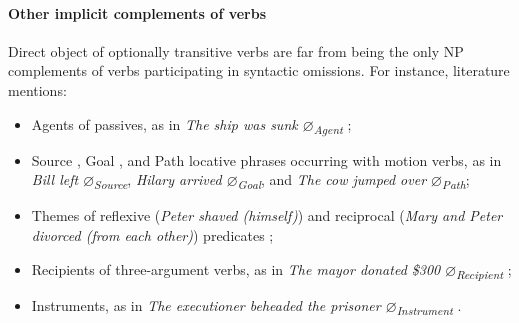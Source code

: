 \paragraph{Other implicit complements of verbs}
Direct object of optionally transitive verbs are far from being the only NP complements of verbs participating in syntactic omissions. For instance, literature mentions:

\begin{itemize}
    \item Agents of passives, as in \textit{The ship was sunk $\varnothing$\textsubscript{Agent}} \parencite{BhattPancheva2017implicit, Lasersohn1993, RuppenhoferMichaelis2014};
    \item Source \parencite{Gillon2006english}, Goal \parencite{Lasersohn1993, RuppenhoferMichaelis2014}, and Path \parencite{recanati2002unarticulated} locative phrases occurring with motion verbs, as in \textit{Bill left $\varnothing$\textsubscript{Source}}, \textit{Hilary arrived $\varnothing$\textsubscript{Goal}}, and  \textit{The cow jumped over $\varnothing$\textsubscript{Path}};
    \item Themes of reflexive (\textit{Peter shaved (himself)}) and reciprocal (\textit{Mary and Peter divorced (from each other)}) predicates \parencite{NemethEniko2014};
    \item Recipients of three-argument verbs, as in \textit{The mayor donated \$300 $\varnothing$\textsubscript{Recipient}} \parencite{ruppenhofer2005regularities};
    \item Instruments, as in \textit{The executioner beheaded the prisoner $\varnothing$\textsubscript{Instrument}} \parencite{KoenigEtAl2002, KoenigEtAl2003, KoenigEtAl2007, RissmanEtAl2015, RissmanRawlins2017, Rissman2010}.
\end{itemize}


